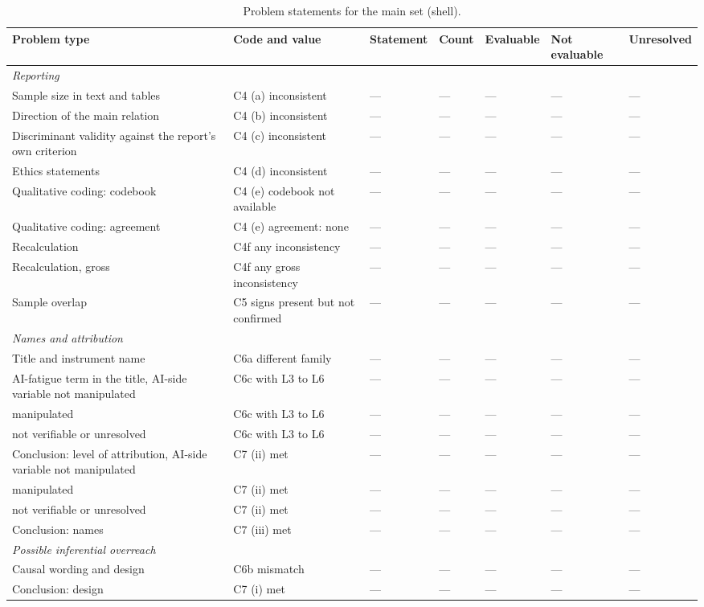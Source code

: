 \begin{table}[!htbp]
\centering
\caption{Problem statements for the main set (shell).}
\footnotesize
\begin{tabularx}{\linewidth}{p{30mm}p{26mm}XXXXX}
\toprule
Problem type & Code and value & Statement & Count & Evaluable & Not evaluable & Unresolved \\
\midrule
\multicolumn{7}{l}{\emph{Reporting}} \\
Sample size in text and tables & C4 (a) inconsistent & --- & --- & --- & --- & --- \\
Direction of the main relation & C4 (b) inconsistent & --- & --- & --- & --- & --- \\
Discriminant validity against the report's own criterion & C4 (c) inconsistent & --- & --- & --- & --- & --- \\
Ethics statements & C4 (d) inconsistent & --- & --- & --- & --- & --- \\
Qualitative coding: codebook & C4 (e) codebook not available & --- & --- & --- & --- & --- \\
Qualitative coding: agreement & C4 (e) agreement: none & --- & --- & --- & --- & --- \\
Recalculation & C4f any inconsistency & --- & --- & --- & --- & --- \\
Recalculation, gross & C4f any gross inconsistency & --- & --- & --- & --- & --- \\
Sample overlap & C5 signs present but not confirmed & --- & --- & --- & --- & --- \\
\multicolumn{7}{l}{\emph{Names and attribution}} \\
Title and instrument name & C6a different family & --- & --- & --- & --- & --- \\
AI-fatigue term in the title, AI-side variable not manipulated & C6c with L3 to L6 & --- & --- & --- & --- & --- \\
\quad manipulated & C6c with L3 to L6 & --- & --- & --- & --- & --- \\
\quad not verifiable or unresolved & C6c with L3 to L6 & --- & --- & --- & --- & --- \\
Conclusion: level of attribution, AI-side variable not manipulated & C7 (ii) met & --- & --- & --- & --- & --- \\
\quad manipulated & C7 (ii) met & --- & --- & --- & --- & --- \\
\quad not verifiable or unresolved & C7 (ii) met & --- & --- & --- & --- & --- \\
Conclusion: names & C7 (iii) met & --- & --- & --- & --- & --- \\
\multicolumn{7}{l}{\emph{Possible inferential overreach}} \\
Causal wording and design & C6b mismatch & --- & --- & --- & --- & --- \\
Conclusion: design & C7 (i) met & --- & --- & --- & --- & --- \\
\bottomrule
\end{tabularx}


\end{table}
